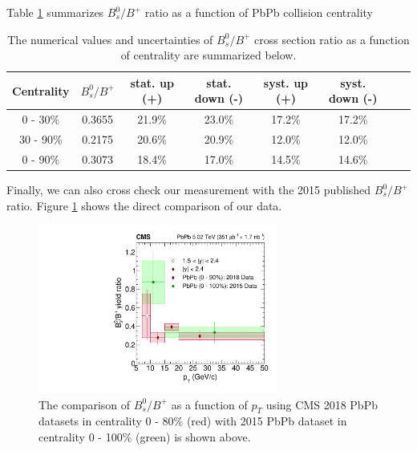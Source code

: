 Table \ref{BsBPPtCMS} summarizes $B^0_s/B^+$ ratio as a function of PbPb collision centrality


\begin{table}[h]
\begin{center}
\caption{The numerical values and uncertainties of $B^0_s/B^+$ cross section ratio as a function of centrality are summarized below.}
\vspace{1em}
\label{BsBPPtCMS}
  \begin{tabular}{| c | c |c | c| c| c| c| c|}
    \hline
Centrality & $B^0_s/B^+$ & stat. up (+) & stat. down (-)  & syst. up (+) & syst. down (-)  \\
    \hline
    \hline
    0 - 30\%  & 0.3655  & 21.9\%  & 23.0\% &  17.2\% & 17.2\% \\
    30 - 90\%  &  0.2175 & 20.6\% & 20.9\% &  12.0\%  & 12.0\%   \\
      0 - 90\%  & 0.3073   & 18.4\%  & 17.0\% &  14.5\% & 14.6\% \\
    \hline
    \hline
\end{tabular}
\end{center}
\end{table}


Finally, we can also cross check our measurement with the 2015 published $B^0_s/B^+$ ratio. Figure \ref{2018Comp2015} shows the direct comparison of our data.

\begin{figure}[hbtp]
\begin{center}
\includegraphics[width=0.70\textwidth]{Figures/Chapter5/2018Comp2015.pdf}
\caption{The comparison of $B^0_s/B^+$ as a function of $p_T$ using CMS 2018 PbPb datasets in centrality 0 - 80\% (red) with 2015 PbPb dataset in centrality 0 - 100\% (green) is shown above.}
\label{2018Comp2015}
\end{center}
\end{figure}

